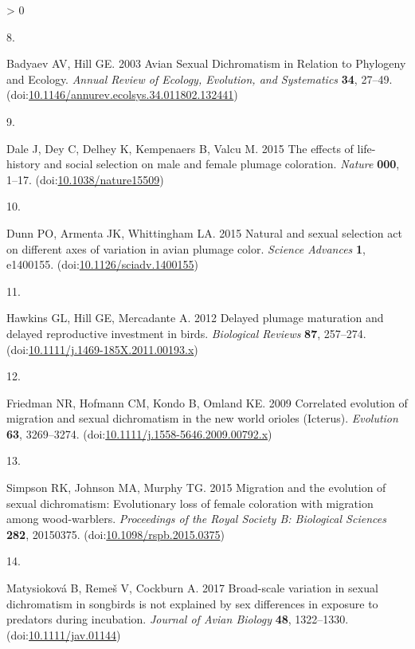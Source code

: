 \documentclass[
  a4paper,
]{article}
\newlength{\cslhangindent}
\newlength{\csllabelwidth}
\newenvironment{CSLReferences}[2] %
 {%
  \setlength{\parindent}{0pt}
  \ifodd #1 \everypar{\setlength{\hangindent}{\cslhangindent}}\ignorespaces\fi
  \ifnum #2 > 0
  \setlength{\parskip}{#2\baselineskip}
  \fi
 }%
 {}
\newcommand{\CSLLeftMargin}[1]{\parbox[t]{\csllabelwidth}{#1}}
\newcommand{\CSLRightInline}[1]{\parbox[t]{\linewidth - \csllabelwidth}{#1}\break}
\begin{document}
\begin{CSLReferences}{0}{0}
\leavevmode\hypertarget{ref-badyaev2003}{}%
\CSLLeftMargin{8. }
\CSLRightInline{Badyaev AV, Hill GE. 2003 Avian {Sexual Dichromatism} in
{Relation} to {Phylogeny} and {Ecology}. \emph{Annual Review of Ecology,
Evolution, and Systematics} \textbf{34}, 27--49.
(doi:\href{https://doi.org/10.1146/annurev.ecolsys.34.011802.132441}{10.1146/annurev.ecolsys.34.011802.132441})}

\leavevmode\hypertarget{ref-dale2015}{}%
\CSLLeftMargin{9. }
\CSLRightInline{Dale J, Dey C, Delhey K, Kempenaers B, Valcu M. 2015 The
effects of life-history and social selection on male and female plumage
coloration. \emph{Nature} \textbf{000}, 1--17.
(doi:\href{https://doi.org/10.1038/nature15509}{10.1038/nature15509})}

\leavevmode\hypertarget{ref-dunn2015}{}%
\CSLLeftMargin{10. }
\CSLRightInline{Dunn PO, Armenta JK, Whittingham LA. 2015 Natural and
sexual selection act on different axes of variation in avian plumage
color. \emph{Science Advances} \textbf{1}, e1400155.
(doi:\href{https://doi.org/10.1126/sciadv.1400155}{10.1126/sciadv.1400155})}

\leavevmode\hypertarget{ref-hawkins2012}{}%
\CSLLeftMargin{11. }
\CSLRightInline{Hawkins GL, Hill GE, Mercadante A. 2012 Delayed plumage
maturation and delayed reproductive investment in birds.
\emph{Biological Reviews} \textbf{87}, 257--274.
(doi:\href{https://doi.org/10.1111/j.1469-185X.2011.00193.x}{10.1111/j.1469-185X.2011.00193.x})}

\leavevmode\hypertarget{ref-friedman2009}{}%
\CSLLeftMargin{12. }
\CSLRightInline{Friedman NR, Hofmann CM, Kondo B, Omland KE. 2009
Correlated evolution of migration and sexual dichromatism in the new
world orioles ({Icterus}). \emph{Evolution} \textbf{63}, 3269--3274.
(doi:\href{https://doi.org/10.1111/j.1558-5646.2009.00792.x}{10.1111/j.1558-5646.2009.00792.x})}

\leavevmode\hypertarget{ref-simpson2015a}{}%
\CSLLeftMargin{13. }
\CSLRightInline{Simpson RK, Johnson MA, Murphy TG. 2015 Migration and
the evolution of sexual dichromatism: Evolutionary loss of female
coloration with migration among wood-warblers. \emph{Proceedings of the
Royal Society B: Biological Sciences} \textbf{282}, 20150375.
(doi:\href{https://doi.org/10.1098/rspb.2015.0375}{10.1098/rspb.2015.0375})}

\leavevmode\hypertarget{ref-matysiokova2017}{}%
\CSLLeftMargin{14. }
\CSLRightInline{Matysioková B, Remeš V, Cockburn A. 2017 Broad-scale
variation in sexual dichromatism in songbirds is not explained by sex
differences in exposure to predators during incubation. \emph{Journal of
Avian Biology} \textbf{48}, 1322--1330.
(doi:\href{https://doi.org/10.1111/jav.01144}{10.1111/jav.01144})}


\end{CSLReferences}
\end{document}
